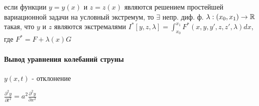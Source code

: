 \documentclass[russian,twocolumn]{article}
\begin{document}
если функции $y=y(x)$ и $z=z(x)$ являются решением простейшей вариационной задачи на условный экстремум, то $\exists$ непр. диф. ф. $\lambda:(x_0,x_1)\to \Bbb R$ такая, что $y$ и $z$ являются экстремалями $I^*[y,z,\lambda]=\int_{x_0}^{x_1}F^*(x,y,y',z,z',\lambda)dx$, где $F^*=F+\lambda(x)G$

\paragraph{Вывод уравнения колебаний струны}

$y(x,t)$ - отклонение

$ \frac{\partial ^2 y}{\partial t^2} = a^2\frac{\partial ^2 y}{\partial x^2}$
\end{document}
